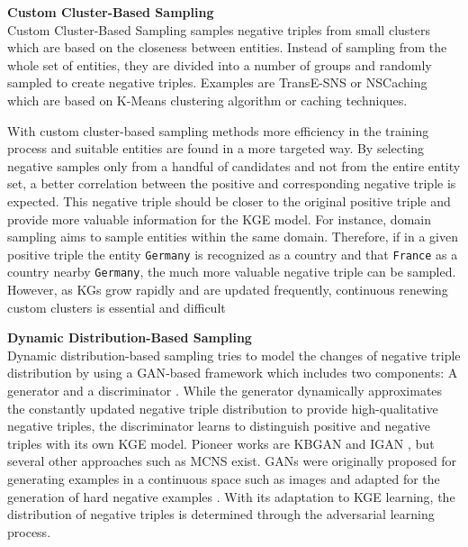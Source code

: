 \textbf{Custom Cluster-Based Sampling} \label{subsubsec:custom_cluster_based_sampling}\\
Custom Cluster-Based Sampling samples negative triples from small clusters which are based on the closeness between entities.
Instead of sampling from the whole set of entities, they are divided into a number of groups and randomly sampled to create negative triples. 
Examples are TransE-\ac{SNS} \cite{TransE-SNS} or \ac{NSCaching} \cite{zhang2019nscaching} which are based on K-Means clustering algorithm or caching techniques. 


With custom cluster-based sampling methods more efficiency in the training process and suitable entities are found in a more targeted way.
By selecting negative samples only from a handful of candidates and not from the entire entity set, a better correlation between the positive and corresponding negative triple is expected.
This negative triple should be closer to the original positive triple and provide more valuable information for the \ac{KGE} model.
For instance, domain sampling \cite{domainSampling} aims to sample entities within the same domain.
Therefore, if in a given positive triple  the entity \texttt{Germany} is recognized as a country and that \texttt{France} as a country nearby \texttt{Germany}, the much more valuable negative triple  can be sampled.
However, as \acp{KG} grow rapidly and are updated frequently, continuous renewing custom clusters is essential and difficult \cite{qianunderstanding}


\textbf{Dynamic Distribution-Based Sampling} \label{subsubsec:dynamic_distribution_based_sampling}\\
%
Dynamic distribution-based sampling tries to model the changes of negative triple distribution by using a \ac{GAN}-based framework which includes two components: 
A generator and a discriminator \cite{zhang2021efficient}.
While the generator dynamically approximates the constantly updated negative triple distribution to provide high-qualitative negative triples,
the discriminator learns to distinguish positive and negative triples with its own \ac{KGE} model.
Pioneer works are \ac{KBGAN} \cite{cai2017kbgan} and \ac{IGAN} \cite{IGAN}, but several other approaches such as \ac{MCNS} \cite{MCNS} exist.
\acp{GAN} were originally proposed for generating examples in a continuous space such as images and adapted for the generation of hard negative examples \cite{zhang2021efficient}.
With its adaptation to \ac{KGE} learning, the distribution of negative triples is determined through the adversarial learning process.  

